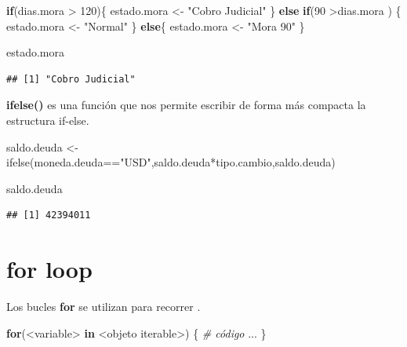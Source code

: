 \documentclass[
  12pt,
]{book}
\newenvironment{Shaded}{\begin{snugshade}}{\end{snugshade}}
\newcommand{\CommentTok}[1]{\textcolor[rgb]{0.56,0.35,0.01}{\textit{#1}}}
\newcommand{\ControlFlowTok}[1]{\textcolor[rgb]{0.13,0.29,0.53}{\textbf{#1}}}
\newcommand{\DecValTok}[1]{\textcolor[rgb]{0.00,0.00,0.81}{#1}}
\newcommand{\FunctionTok}[1]{\textcolor[rgb]{0.00,0.00,0.00}{#1}}
\newcommand{\NormalTok}[1]{#1}
\newcommand{\OtherTok}[1]{\textcolor[rgb]{0.56,0.35,0.01}{#1}}
\newcommand{\SpecialCharTok}[1]{\textcolor[rgb]{0.00,0.00,0.00}{#1}}
\newcommand{\StringTok}[1]{\textcolor[rgb]{0.31,0.60,0.02}{#1}}
\begin{document}
\begin{Shaded}
\begin{Highlighting}[]
\ControlFlowTok{if}\NormalTok{(dias.mora }\SpecialCharTok{\textgreater{}} \DecValTok{120}\NormalTok{)\{}
\NormalTok{  estado.mora }\OtherTok{\textless{}{-}} \StringTok{"Cobro Judicial"}
\NormalTok{\} }\ControlFlowTok{else} \ControlFlowTok{if}\NormalTok{(}\DecValTok{90} \SpecialCharTok{\textgreater{}}\NormalTok{dias.mora ) \{}
\NormalTok{  estado.mora }\OtherTok{\textless{}{-}} \StringTok{"Normal"}
\NormalTok{\} }\ControlFlowTok{else}\NormalTok{\{ }
\NormalTok{  estado.mora }\OtherTok{\textless{}{-}} \StringTok{"Mora 90"}
\NormalTok{  \}}

\NormalTok{estado.mora}
\end{Highlighting}
\end{Shaded}

\begin{verbatim}
## [1] "Cobro Judicial"
\end{verbatim}

\textbf{ifelse()} es una función que nos permite escribir de forma más compacta la estructura if-else.

\begin{Shaded}
\begin{Highlighting}[]
\NormalTok{saldo.deuda }\OtherTok{\textless{}{-}} \FunctionTok{ifelse}\NormalTok{(moneda.deuda}\SpecialCharTok{==}\StringTok{"USD"}\NormalTok{,saldo.deuda}\SpecialCharTok{*}\NormalTok{tipo.cambio,saldo.deuda)}

\NormalTok{saldo.deuda}
\end{Highlighting}
\end{Shaded}

\begin{verbatim}
## [1] 42394011
\end{verbatim}

\hypertarget{for-loop}{%
\section{\texorpdfstring{\textbf{for loop}}{for loop}}\label{for-loop}}

Los bucles \textbf{for} se utilizan para recorrer .

\begin{Shaded}
\begin{Highlighting}[]
\ControlFlowTok{for}\NormalTok{(}\SpecialCharTok{\textless{}}\NormalTok{variable}\SpecialCharTok{\textgreater{}} \ControlFlowTok{in} \SpecialCharTok{\textless{}}\NormalTok{objeto iterable}\SpecialCharTok{\textgreater{}}\NormalTok{) \{}
  \CommentTok{\# código}
\NormalTok{  ...}
\NormalTok{\}}
\end{Highlighting}
\end{Shaded}
\end{document}
